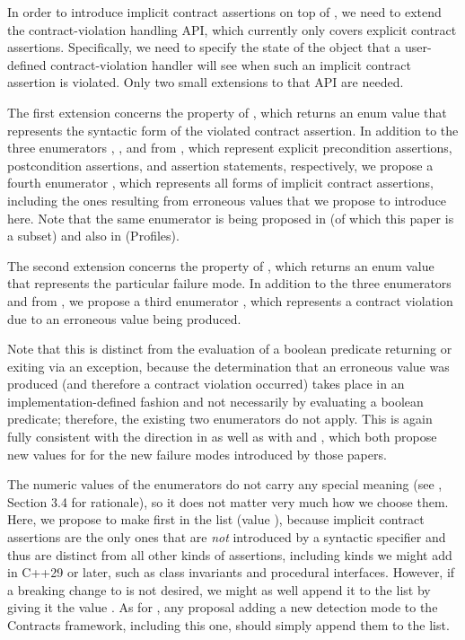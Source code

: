 In order to introduce implicit contract assertions on top of \cite{P2900R13}, we need to extend the contract-violation handling API, which currently only covers explicit contract assertions. Specifically, we need to specify the state of the \mbox{} object that a user-defined contract-violation handler will see when such an implicit contract assertion is violated. Only two small extensions to that API are needed. 

The first extension concerns the  property of , which returns an enum value that represents the syntactic form of the violated contract assertion. In addition to the three enumerators , , and  from \cite{P2900R13}, which represent explicit precondition assertions, postcondition assertions, and assertion statements, respectively, we propose a fourth enumerator , which represents all forms of implicit contract assertions, including the ones resulting from erroneous values that we propose to introduce here. Note that the same enumerator is being proposed in \cite{P3100R1} (of which this paper is a subset) and also in \cite{P3081R1} (Profiles).

The second extension concerns the  property of , which returns an enum value that represents the particular failure mode. In addition to the three enumerators  and  from \cite{P2900R13}, we propose a third enumerator , which represents a contract violation due to an erroneous value being produced.

Note that this is distinct from the evaluation of a boolean predicate returning  or exiting via an exception, because the determination that an erroneous value was produced (and therefore a contract violation occurred) takes place in an implementation-defined fashion and not necessarily by evaluating a boolean predicate; therefore, the existing two enumerators do not apply. This is again fully consistent with the direction in \cite{P3100R1} as well as with \cite{P3081R1} and \cite{P3599R0}, which both propose new values for  for the new failure modes introduced by those papers.

The numeric values of the enumerators do not carry any special meaning (see \cite{P3327R0}, Section 3.4 for rationale), so it does not matter very much how we choose them. Here, we propose to make  first in the list (value  ), because implicit contract assertions are the only ones that are \emph{not} introduced by a syntactic specifier and thus are distinct from all other kinds of assertions, including kinds we might add in C++29 or later, such as class invariants and procedural interfaces. However, if a breaking change to \cite{P2900R13} is not desired, we might as well  append it to the list by giving it the value . As for , any proposal adding a new detection mode to the Contracts framework, including this one, should simply append them to the list.

